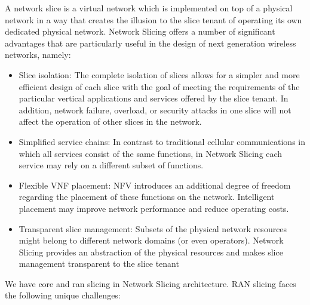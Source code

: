 \documentclass[conference]{IEEEtran}
\begin{document}
A network slice is a virtual network which is implemented on top
of a physical network in a way that creates the illusion to the
slice tenant of operating its own dedicated physical network.
Network Slicing offers a number of significant advantages
that are particularly useful in the design of next generation
wireless networks, namely:
\begin{itemize}
\item  Slice isolation: The complete isolation of slices allows
for a simpler and more efficient design of each slice with
the goal of meeting the requirements of the particular
vertical applications and services offered by the slice
tenant. In addition, network failure, overload, or security
attacks in one slice will not affect the operation of other
slices in the network.
\item Simplified service chains: In contrast to traditional cellular communications in which all services consist of the
same functions, in Network Slicing each service may rely
on a different subset of functions.
\item Flexible VNF placement: NFV introduces an additional
degree of freedom regarding the placement of these functions on the network. Intelligent placement may improve
network performance and reduce operating costs.
\item Transparent slice management: Subsets of the physical
network resources might belong to different network
domains (or even operators). Network Slicing provides
an abstraction of the physical resources and makes slice
management transparent to the slice tenant
\end{itemize}
We have core and ran slicing in Network Slicing architecture.
RAN slicing faces the following unique challenges: 
\end{document}
